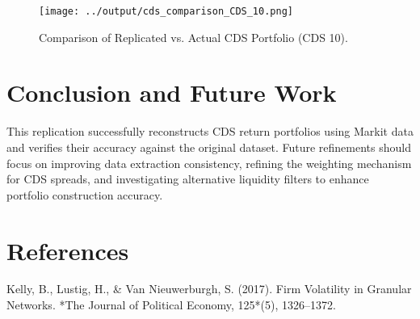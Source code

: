 \documentclass{article}
\begin{document}
\begin{figure}[H]
    \centering
    \texttt{[image: ../output/cds\_comparison\_CDS\_10.png]}  %
    \caption{\label{fig:cds_comparison}Comparison of Replicated vs. Actual CDS Portfolio (CDS 10).}
\end{figure}

\section{Conclusion and Future Work}

This replication successfully reconstructs CDS return portfolios using Markit data and verifies their accuracy against the original dataset. Future refinements should focus on improving data extraction consistency, refining the weighting mechanism for CDS spreads, and investigating alternative liquidity filters to enhance portfolio construction accuracy.

\section{References}
Kelly, B., Lustig, H., \& Van Nieuwerburgh, S. (2017). Firm Volatility in Granular Networks. *The Journal of Political Economy, 125*(5), 1326–1372.  
\end{document}
